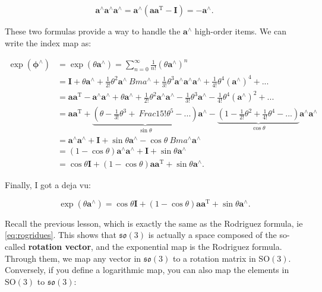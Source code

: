 \begin{equation}
\bm{a}^{\wedge} \bm{a}^{\wedge} \bm{a}^{\wedge} = \bm{a}^\wedge (\bm{a}\bm{a} ^\mathrm{T}-\bm{I}) = - \bm{a}^{\wedge}.
\end{equation}

These two formulas provide a way to handle the $\bm{a}^\wedge$ high-order items. We can write the index map as:

\begin{align*}
\exp \left( {{\boldsymbol{\phi} ^ \wedge }} \right) &= \exp \left( {\theta {\bm{a}^ \wedge }} \right) = \sum\limits_ {n = 0}^\infty {\frac{1}{{n!}}{{\left( {\theta {\bm{a}^ \wedge }} \right)}^n}} \\
&= \bm{I} + \theta {\bm{a}^ \wedge } + \frac{1}{{2!}}{\theta ^2}{\bm{a}^ \wedge }{\ Bm{a}^ \wedge } + \frac{1}{{3!}}{\theta ^3}{\bm{a}^ \wedge }{\bm{a}^ \wedge }{\bm{ a}^ \wedge } + \frac{1}{{4!}}{\theta ^4}{\left( {{\bm{a}^ \wedge }} \right)^4} + ... \\
&= \bm{a} {\bm{a}^\mathrm{T}} - {\bm{a}^ \wedge }{\bm{a}^ \wedge } + \theta {\bm{a} ^ \wedge } + \frac{1}{{2!}}\theta^2 {\bm{a}^ \wedge }{\bm{a}^ \wedge } - \frac{1}{{3! }}{\theta ^3}{\bm{a}^ \wedge } - \frac{1}{{4!}}{\theta ^4}{\left( {{\bm{a}^ \wedge }} \right)^2} + ...\\
&= \bm{a}{\bm{a}^\mathrm{T}} + \underbrace{\left( {\theta - \frac{1}{{3!}}{\theta ^3} + \ Frac{1}{{5!}}{\theta ^5} - ...} \right)}_{\sin \theta} {\bm{a}^ \wedge } - \underbrace{\left( { 1 - \frac{1}{{2!}}{\theta ^2} + \frac{1}{{4!}}{\theta ^4} - ...} \right)}_{\cos \theta}{\bm{a}^ \wedge }{\bm{a}^ \wedge }\\
&= {\bm{a}^ \wedge }{\bm{a}^ \wedge } + \bm{I} + \sin \theta {\bm{a}^ \wedge } - \cos \theta {\ Bm{a}^ \wedge }{\bm{a}^ \wedge }\\
&= (1 - \cos \theta ){\bm{a}^ \wedge }{\bm{a}^ \wedge } + \bm{I} + \sin \theta {\bm{a}^ \wedge }\\
&= \cos \theta \bm{I} + (1 - \cos \theta )\bm{a}{\bm{a}^\mathrm{T}} + \sin \theta {\bm{a}^ \wedge }.
\end{align*}

Finally, I got a deja vu:

\begin{equation}
\exp( \theta \bm{a}^\wedge ) = \cos \theta \bm{I} + (1 - \cos \theta )\bm{a}{\bm{a}^\mathrm{T} } + \sin \theta {\bm{a}^ \wedge }.
\end{equation}

Recall the previous lesson, which is exactly the same as the Rodriguez formula, ie \eqref{eq:rogridues}. This shows that $\mathfrak{so}(3)$ is actually a space composed of the so-called \textbf{rotation vector}, and the exponential map is the Rodriguez formula. Through them, we map any vector in $\mathfrak{so}(3)$ to a rotation matrix in $\mathrm{SO}(3)$. Conversely, if you define a logarithmic map, you can also map the elements in $\mathrm{SO}(3)$ to $\mathfrak{so}(3)$:

